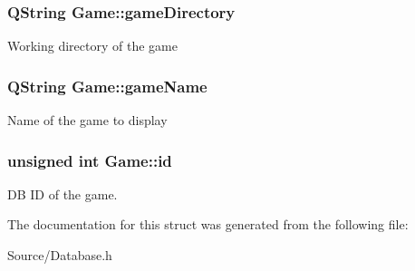 \subsubsection[{game\+Directory}]{\setlength{\rightskip}{0pt plus 5cm}Q\+String Game\+::game\+Directory}\label{struct_game_a5a544cd9e4694e43fdf3fff9fd7417b3}
Working directory of the game \hypertarget{struct_game_a2dc75f118e0b9b79715efb8fa7881dc2}{}
\subsubsection[{game\+Name}]{\setlength{\rightskip}{0pt plus 5cm}Q\+String Game\+::game\+Name}\label{struct_game_a2dc75f118e0b9b79715efb8fa7881dc2}
Name of the game to display \hypertarget{struct_game_a437d78e3b0cc483fd0be0af651695d3d}{}
\subsubsection[{id}]{\setlength{\rightskip}{0pt plus 5cm}unsigned int Game\+::id}\label{struct_game_a437d78e3b0cc483fd0be0af651695d3d}
D\+B I\+D of the game. 

The documentation for this struct was generated from the following file\+:\begin{DoxyCompactItemize}
\item 
Source/Database.\+h\end{DoxyCompactItemize}
